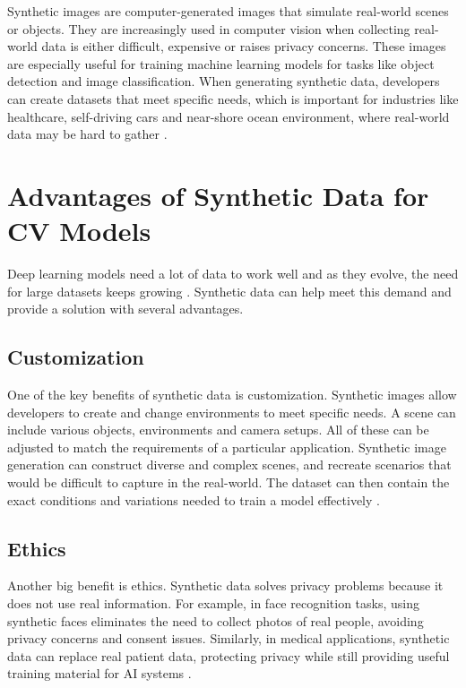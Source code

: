 Synthetic images are computer-generated images that simulate real-world scenes or objects. They are increasingly used in computer vision when collecting real-world data is either difficult, expensive or raises privacy concerns. These images are especially useful for training machine learning models for tasks like object detection and image classification. When generating synthetic data, developers can create datasets that meet specific needs, which is important for industries like healthcare, self-driving cars and near-shore ocean environment, where real-world data may be hard to gather \cite{jimaging8110310, safety}.

\section{Advantages of Synthetic Data for CV Models}

Deep learning models need a lot of data to work well and as they evolve, the need for large datasets keeps growing \cite{10.1145/3042064, nikolenko2021synthetic}. Synthetic data can help meet this demand and provide a solution with several advantages.
 
\subsection{Customization}
One of the key benefits of synthetic data is customization. Synthetic images allow developers to create and change environments to meet specific needs. A scene can include various objects, environments and camera setups. All of these can be adjusted to match the requirements of a particular application. Synthetic image generation can construct diverse and complex scenes, and recreate scenarios that would be difficult to capture in the real-world. The dataset can then contain the exact conditions and variations needed to train a model effectively \cite{jimaging8110310, rajpura2017objectdetectionusingdeep}.

\subsection{Ethics}
Another big benefit is ethics. Synthetic data solves privacy problems because it does not use real information. For example, in face recognition tasks, using synthetic faces eliminates the need to collect photos of real people, avoiding privacy concerns and consent issues. Similarly, in medical applications, synthetic data can replace real patient data, protecting privacy while still providing useful training material for AI systems \cite{jimaging8110310}.

